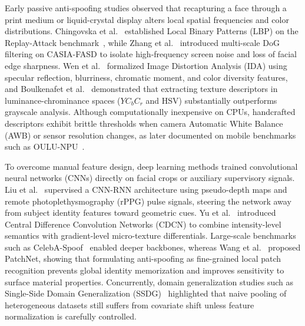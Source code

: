Early passive anti-spoofing studies observed that recapturing a face through a print medium or liquid-crystal display alters local spatial frequencies and color distributions. Chingovska et al.~\cite{chingovska2012effectiveness} established Local Binary Patterns (LBP) on the Replay-Attack benchmark~\cite{anjos2011counter}, while Zhang et al.~\cite{zhang2012face} introduced multi-scale DoG filtering on CASIA-FASD to isolate high-frequency screen noise and loss of facial edge sharpness. Wen et al.~\cite{wen2015face} formalized Image Distortion Analysis (IDA) using specular reflection, blurriness, chromatic moment, and color diversity features, and Boulkenafet et al.~\cite{boulkenafet2016face} demonstrated that extracting texture descriptors in luminance-chrominance spaces ($YC_bC_r$ and HSV) substantially outperforms grayscale analysis. Although computationally inexpensive on CPUs, handcrafted descriptors exhibit brittle thresholds when camera Automatic White Balance (AWB) or sensor resolution changes, as later documented on mobile benchmarks such as OULU-NPU~\cite{boulkenafet2017oulu}.

To overcome manual feature design, deep learning methods trained convolutional neural networks (CNNs) directly on facial crops or auxiliary supervisory signals. Liu et al.~\cite{liu2018learning} supervised a CNN-RNN architecture using pseudo-depth maps and remote photoplethysmography (rPPG) pulse signals, steering the network away from subject identity features toward geometric cues. Yu et al.~\cite{yu2020searching} introduced Central Difference Convolution Networks (CDCN) to combine intensity-level semantics with gradient-level micro-texture differentials. Large-scale benchmarks such as CelebA-Spoof~\cite{zhang2020celeba} enabled deeper backbones, whereas Wang et al.~\cite{wang2022patchnet} proposed PatchNet, showing that formulating anti-spoofing as fine-grained local patch recognition prevents global identity memorization and improves sensitivity to surface material properties. Concurrently, domain generalization studies such as Single-Side Domain Generalization (SSDG)~\cite{jia2020single} highlighted that naive pooling of heterogeneous datasets still suffers from covariate shift unless feature normalization is carefully controlled.

